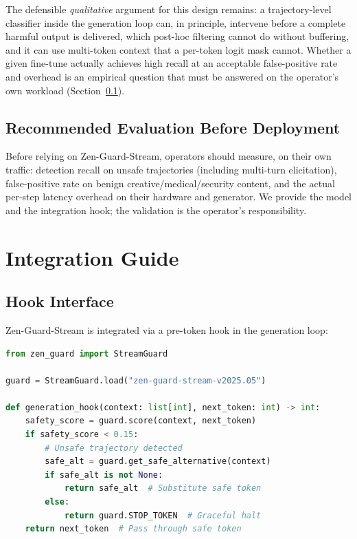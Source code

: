 \documentclass[11pt,a4paper]{article}
\begin{document}
The defensible \emph{qualitative} argument for this design remains: a trajectory-level
classifier inside the generation loop can, in principle, intervene before a complete harmful
output is delivered, which post-hoc filtering cannot do without buffering, and it can use
multi-token context that a per-token logit mask cannot. Whether a given fine-tune actually
achieves high recall at an acceptable false-positive rate and overhead is an empirical
question that must be answered on the operator's own workload (Section~\ref{sec:eval-rec}).

\subsection{Recommended Evaluation Before Deployment}
\label{sec:eval-rec}

Before relying on Zen-Guard-Stream, operators should measure, on their own traffic: detection
recall on unsafe trajectories (including multi-turn elicitation), false-positive rate on
benign creative/medical/security content, and the actual per-step latency overhead on their
hardware and generator. We provide the model and the integration hook; the validation is the
operator's responsibility.

\section{Integration Guide}

\subsection{Hook Interface}

Zen-Guard-Stream is integrated via a pre-token hook in the generation loop:

\begin{lstlisting}[language=Python, caption=Integration Example]
from zen_guard import StreamGuard

guard = StreamGuard.load("zen-guard-stream-v2025.05")

def generation_hook(context: list[int], next_token: int) -> int:
    safety_score = guard.score(context, next_token)
    if safety_score < 0.15:
        # Unsafe trajectory detected
        safe_alt = guard.get_safe_alternative(context)
        if safe_alt is not None:
            return safe_alt  # Substitute safe token
        else:
            return guard.STOP_TOKEN  # Graceful halt
    return next_token  # Pass through safe token
\end{lstlisting}
\end{document}
